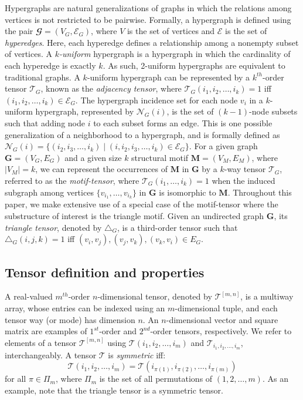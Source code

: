 \documentclass[10pt, journal, compsoc, final]{IEEEtran}
\newcommand{\bs}[1]{\boldsymbol{#1}}
\newcommand{\Tensor}[1]{\mathbf{\mathcal{#1}}}
\newcommand{\Graph}[1]{\mathit{\mathbf{\bs{#1}}}}
\newcommand{\Set}[1]{\mathit{#1}}
\newcommand{\Hypergraph}[1]{\mathbfcal{#1}}
\newcommand{\Hyperset}[1]{\mathcal{#1}}
\newcommand{\where}{\mid}
\begin{document}
Hypergraphs are natural generalizations of graphs in which the relations among vertices is
not restricted to be pairwise. Formally, a hypergraph is defined using the pair
$\Hypergraph{G}=(\Set{V}_G, \Hyperset{E}_G)$, where $\Set{V}$ is the set of vertices and
$\Hyperset{E}$ is the set of \textit{hyperedges}. Here, each hyperedge defines a relationship
among a nonempty subset of vertices. A \textit{$k$-uniform} hypergraph is a hypergraph in
which the cardinality of each hyperedge is exactly $k$. As such, 2-uniform hypergraphs are
equivalent to traditional graphs. A $k$-uniform hypergraph can be represented by a $k^{th}$-order
tensor $\Tensor{T}_G$, known as the \textit{adjacency tensor}, where
$\Tensor{T}_G(i_1, i_2, \ldots, i_k) = 1$ iff $(i_1, i_2, \ldots, i_k) \in \Hyperset{E}_G$.
The hypergraph incidence set for each node $v_i$ in a $k$-uniform hypergraph, represented by
$\Hyperset{N}_G(i)$, is the set of $(k-1)$-node subsets such that adding node $i$ to each
subset forms an edge. This is one possible generalization of a neighborhood to a hypergraph,
and is formally defined as $\Hyperset{N}_G(i) = \{(i_2, i_3, \ldots, i_k) \where (i, i_2, i_3, \ldots, i_k) \in
\Hyperset{E}_G \}$. For a given graph $\Graph{G} = (\Set{V_G}, \Set{E_G})$ and a given size
$k$ structural motif $\Graph{M} = (\Set{V_M}, \Set{E_M})$, where $|\Set{V_M}| = k$, we can
represent the occurrences of $\Graph{M}$ in $\Graph{G}$ by a $k$-way tensor $\Tensor{T}_G$,
referred to as the \textit{motif-tensor}, where $\Tensor{T}_G(i_1, \ldots, i_k) = 1$ when the
induced subgraph among vertices $\{v_{i_1}, \ldots, v_{i_k}\}$ in $\Graph{G}$ is isomorphic to
$\Graph{M}$. Throughout this paper, we make extensive use of a special case of the motif-tensor
where the substructure of interest is the triangle motif. Given an undirected graph
$\Graph{G}$, its \textit{triangle tensor}, denoted by $\Tensor{\bigtriangleup}_G$, is a
third-order tensor such that $\Tensor{\bigtriangleup}_G(i, j, k) = 1$ iff  $(v_i, v_j),
(v_j, v_k), (v_k, v_i) \in \Set{E}_G$.

\subsection{Tensor definition and properties}
A real-valued $m^{th}$-order $n$-dimensional tensor, denoted by $\Tensor{T}^{[m, n]}$, is a
multiway array, whose entries can be indexed using an $m$-dimensional tuple, and each tensor
way (or mode) has dimension $n$. An $n$-dimensional vector and square matrix are examples
of $1^{st}$-order and $2^{nd}$-order tensors, respectively. We refer to elements of a
tensor $\Tensor{T}^{[m, n]}$ using $\Tensor{T}(i_1, i_2,\ldots, i_m)$ and
$\Tensor{T}_{i_1, i_2,\ldots, i_m}$, interchangeably. A tensor $\Tensor{T}$ is \textit{symmetric} iff:
\begin{equation}
\Tensor{T}(i_1, i_2,\ldots, i_m) = \Tensor{T}(i_{\pi(1)}, i_{\pi(2)},\ldots, i_{\pi(m)})
\end{equation}
for all $\pi \in \Pi_m$, where $\Pi_m$ is the set of all permutations of $(1,2, \ldots, m)$. 
As an example, note that the triangle tensor is a symmetric tensor. 
\end{document}
